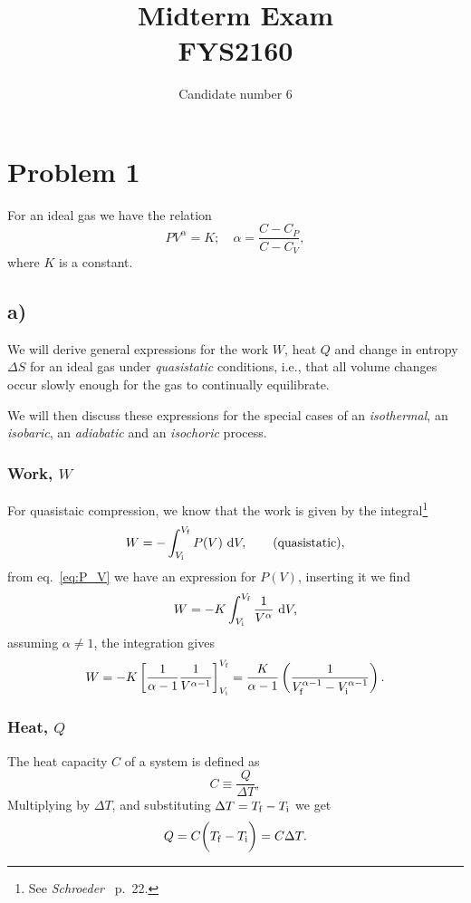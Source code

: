 \documentclass[a4paper, 11pt, titlepage, english]{article}
\author{Candidate number 6}
\title{Midterm Exam \\ FYS2160}
\newcommand{\beq}{\begin{equation}}
\newcommand{\eeq}{\end{equation}}
\begin{document}
\maketitle
\newpage\null\thispagestyle{empty}\newpage
\setcounter{page}{1} 

\section*{Problem 1}
For an ideal gas we have the relation
\beq
PV^\alpha = K; \quad \alpha = \frac{C-C_P}{C-C_V},
\label{eq:P_V}
\eeq
where $K$ is a constant.

\subsection*{a)}
We will derive general expressions for the work $W$, heat $Q$ and change in entropy $\Delta S$ for an ideal gas under \emph{quasistatic} conditions, i.e., that all volume changes occur slowly enough for the gas to continually equilibrate.

We will then discuss these expressions for the special cases of an \emph{isothermal}, an \emph{isobaric}, an \emph{adiabatic} and an \emph{isochoric} process.


\subsubsection*{Work, $W$}
For quasistaic compression, we know that the work is given by the integral\footnote{See {\it Schroeder\ } p.\ 22.}
$$W = - \int_{V_{\rm i}}^{V_{\rm f}} P(V){\rm\ d}V, \qquad {\rm (quasistatic)},$$
from eq.\ \ref{eq:P_V} we have an expression for $P(V)$, inserting it we find
$$W = - K\int_{V_{\rm i}}^{V_{\rm f}} \frac{1}{V^\alpha} {\rm\ d}V,$$
assuming $\alpha \neq 1$, the integration gives
\beq
W = -K\left[\frac{1}{\alpha-1} \frac{1}{V^{\alpha-1}} \right]_{V_{\rm i}}^{V_{\rm f}} = \frac{K}{\alpha-1} \left( \frac{1}{V_{\rm f}^{\alpha-1} - V_{\rm i}^{\alpha-1}} \right).
\eeq

\subsubsection*{Heat, $Q$}
The heat capacity $C$ of a system is defined as 
$$C \equiv \frac{Q}{\Delta T},$$
Multiplying by $\Delta T$, and substituting $\Delta T = T_{\rm f} - T_{\rm i}$ we get
\beq
Q = C \bigg( T_{\rm f} - T_{\rm i}\bigg) = C\Delta T.
\eeq
\end{document}
